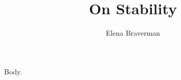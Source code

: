 \documentclass{tpifx}
\begin{document}
\title{On Stability}
\author{Elena Braverman}
\address{University of Calgary, Canada}
\maketitle
Body.
\end{document}

